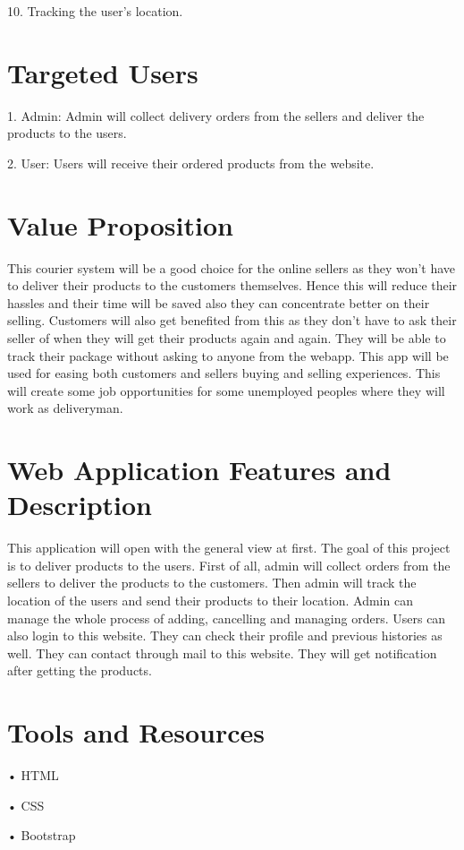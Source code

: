 \documentclass[12pt]{article}
\begin{document}
10.	Tracking the user’s location.

\setcounter{page}{1}
\section*{Targeted Users}
1.	Admin: Admin will collect delivery orders from the sellers and deliver the products to the users. 

2.	User: Users will receive their ordered products from the website.

\section*{Value Proposition}
This courier system will be a good choice for the online sellers as they won’t have to deliver their products to the customers themselves. Hence this will reduce their hassles and their time will be saved also they can concentrate better on their selling. Customers will also get benefited from this as they don’t have to ask their seller of when they will get their products again and again. They will be able to track their package without asking to anyone from the webapp. This app will be used for easing both customers and sellers buying and selling experiences. This will create some job opportunities for some unemployed peoples where they will work as deliveryman.

\section*{Web Application Features and Description}
This application will open with the general view at first. The goal of this project is to deliver products to the users. First of all, admin will collect orders from the sellers to deliver the products to the customers. Then admin will track the location of the users and send their products to their location. Admin can manage the whole process of adding, cancelling and managing orders. Users can also login to this website. They can check their profile and previous histories as well. They can contact through mail to this website. They will get notification after getting the products.

\section*{Tools and Resources}
•	HTML

•	CSS

•	Bootstrap
\end{document}
